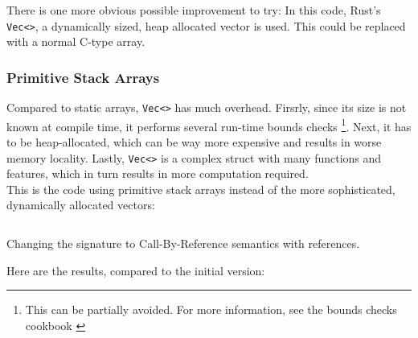 There is one more obvious possible improvement to try: In this code, Rust's \texttt{Vec<>}, a dynamically sized, heap allocated vector is used. This could be replaced with a normal C-type array.

\subsubsection{Primitive Stack Arrays}
Compared to static arrays, \texttt{Vec<>} has much overhead. Firsrly, since its size is not known at compile time, it performs several run-time bounds checks \footnote{This can be partially avoided. For more information, see the bounds checks cookbook \cite{bounds_cookbook}}. Next, it has to be heap-allocated, which can be way more expensive and results in worse memory locality. Lastly, \texttt{Vec<>} is a complex struct with many functions and features, which in turn results in more computation required.\\

This is the code using primitive stack arrays instead of the more sophisticated, dynamically allocated vectors:

\begin{listing}[H]
  \inputminted{rust}{./assets/array.rs}
\caption{Changing the signature to Call-By-Reference semantics with references.}
\end{listing}

Here are the results, compared to the initial version:

